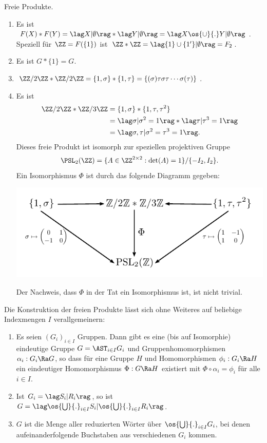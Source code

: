 \BSP Freie Produkte.
\begin{enumerate}
\item Es ist $F(X)*F(Y) = \lag X|\emptyset\rag*\lag Y|\emptyset\rag
=\lag X\os{\cup}{.} Y|\emptyset\rag$.
Speziell für $\ZZ=F(\{1\})$ ist
$\ZZ*\ZZ=\lag \{1\}\cup\{1'\}|\emptyset\rag=F_2$.
\item Es ist $G*\{1\}=G$.
\item $\ZZ/2\ZZ*\ZZ/2\ZZ=\{1,\sigma\}*\{1,\tau\}
=\{(\sigma)\tau\sigma\tau\cdots\sigma(\tau)\}$.
\item Es ist
\begin{align*}
\ZZ/2\ZZ * \ZZ/3\ZZ &= \{1,\sigma\}*\{1,\tau,\tau^2\} \\
&=\lag\sigma|\sigma^2=1\rag*\lag\tau|\tau^3=1\rag\\
&=\lag\sigma,\tau|\sigma^2=\tau^3=1\rag.
\end{align*}
Dieses freie Produkt ist isomorph zur speziellen projektiven Gruppe
\[
\PSL_2(\ZZ)
=\{
A\in \ZZ^{2\times 2} : \det(A)=1
\}/\{-I_2, I_2\}.
\]
Ein Isomorphismus $\Phi$ ist durch das folgende Diagramm gegeben:
\begin{center}
	\includegraphics{grugraImages/PSL}
\end{center}
Der Nachweis, dass $\Phi$ in der Tat ein Isomorphismus ist, ist nicht
trivial.
\end{enumerate}

\BEM Die Konstruktion der freien Produkte lässt sich
ohne Weiteres auf beliebige Indexmengen $I$ verallgemeinern:
\begin{enumerate}
\item Es seien $(G_i)_{i\in I}$ Gruppen. Dann gibt es eine (bis auf
Isomorphie) eindeutige Gruppe $G=\AST_{i\in I} G_i$ und
Gruppenhomomorphismen $\alpha_i:G_i\Ra G$, so dass
für eine Gruppe $H$ und Homomorphismen $\phi_i:G_i\Ra H$
ein eindeutiger Homomorphismus $\Phi:G\Ra H$ existiert mit
$\Phi\circ\alpha_i=\phi_i$ für alle $i\in I$.
\item Ist $G_i=\lag S_i|R_i\rag$, so ist
$G=\lag \os{\bigcup}{.}_{i\in I}S_i|\os{\bigcup}{.}_{i\in I}R_i \rag$.
\item $G$ ist die Menge aller reduzierten Wörter über
$\os{\bigcup}{.}_{i\in I} G_i$, bei denen aufeinanderfolgende
Buchstaben aus verschiedenen $G_i$ kommen.
\end{enumerate}

